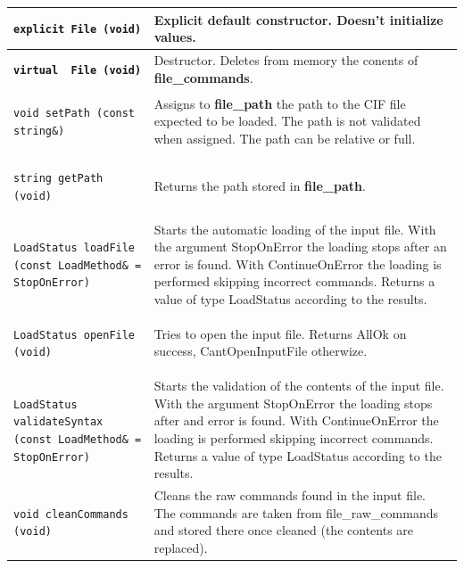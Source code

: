 \documentclass[11pt,twoside,openany,x11names,svgnames]{memoir}
\begin{document}
{\footnotesize
\begin{longtable}{| >{\bfseries}p{9.8cm} | p{5.7cm} |}
	\hline
	
	\texttt{explicit File (void)} & Explicit default constructor. Doesn't initialize values. \\
	
	\hline		
	
	\texttt{virtual ~File (void)} & Destructor. Deletes from memory the conents of \textbf{file\_commands}. \\
	
	\hline
	
	\texttt{void setPath (const string\&)} & Assigns to \textbf{file\_path} the path to the CIF file expected to be loaded. The path is not validated when assigned. The path can be relative or full.\\
	
	\hline
	
	\texttt{string getPath (void)} & Returns the path stored in \textbf{file\_path}. \\
			
	\hline
	
	\texttt{LoadStatus loadFile (const LoadMethod\& = StopOnError)} & Starts the automatic loading of the input file. With the argument StopOnError the loading stops after an error is found. With ContinueOnError the loading is performed skipping incorrect commands. Returns a value of type LoadStatus according to the results.\\

	\hline
	
	\texttt{LoadStatus openFile (void)} & Tries to open the input file. Returns AllOk on success, CantOpenInputFile otherwize. \\
	
	\hline
	
	\texttt{LoadStatus validateSyntax (const LoadMethod\& = StopOnError)} & Starts the validation of the contents of the input file. With the argument StopOnError the loading stops after and error is found. With ContinueOnError the loading is performed skipping incorrect commands. Returns a value of type LoadStatus according to the results. \\
	
	\hline
	
	\texttt{void cleanCommands (void)} & Cleans the raw commands found in the input file. The commands are taken from file\_raw\_commands and stored there once cleaned (the contents are replaced). \\
			

\end{longtable}}
\end{document}

